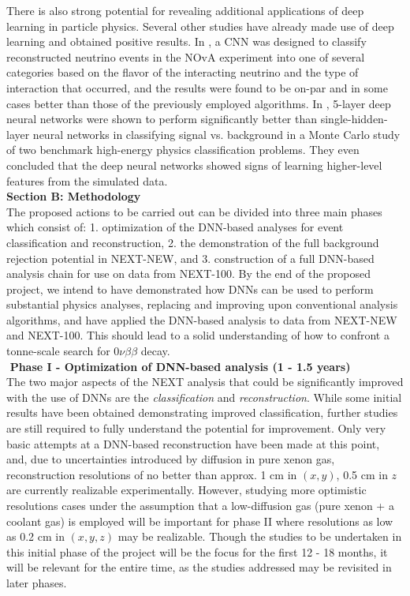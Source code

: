 \documentclass[11pt,a4paper]{article}
\begin{document}
There is also strong potential for revealing additional applications of deep learning in particle physics. Several other studies have already made use of deep learning and obtained positive results. In \cite{Aurisano_2016}, a CNN was designed to classify reconstructed neutrino events in the NOvA experiment into one of several categories based on the flavor of the interacting neutrino and the type of interaction that occurred, and the results were found to be on-par and in some cases better than those of the previously employed algorithms. In \cite{Baldi_2014}, 5-layer deep neural networks were shown to perform significantly better than single-hidden-layer neural networks in classifying signal vs. background in a Monte Carlo study of two benchmark high-energy physics classification problems. They even concluded that the deep neural networks showed signs of learning higher-level features from the simulated data.\\

{\noindent\textbf{Section B: Methodology}}\\
The proposed actions to be carried out can be divided into three main phases which consist of: 1. optimization of the DNN-based analyses for event classification and reconstruction, 2. the demonstration of the full background rejection potential in NEXT-NEW, and 3. construction of a full DNN-based analysis chain for use on data from NEXT-100. By the end of the proposed project, we intend to have demonstrated how DNNs can be used to perform substantial physics analyses, replacing and improving upon conventional analysis algorithms, and have applied the DNN-based analysis to data from NEXT-NEW and NEXT-100. This should lead to a solid understanding of how to confront a tonne-scale search for $0\nu\beta\beta$ decay.\\

\noindent\textbf{\textbullet\,\,Phase I - Optimization of DNN-based analysis (1 - 1.5 years)}\\
The two major aspects of the NEXT analysis that could be significantly improved with the use of DNNs are the \emph{classification} and \emph{reconstruction}. While some initial results have been obtained demonstrating improved classification, further studies are still required to fully understand the potential for improvement. Only very basic attempts at a DNN-based reconstruction have been made at this point, and, due to uncertainties introduced by diffusion in pure xenon gas, reconstruction resolutions of no better than approx. 1 cm in $(x,y)$, 0.5 cm in $z$ are currently realizable experimentally. However, studying more optimistic resolutions cases under the assumption that a low-diffusion gas (pure xenon + a coolant gas) is employed will be important for phase II where resolutions as low as 0.2 cm in $(x,y,z)$ may be realizable. Though the studies to be undertaken in this initial phase of the project will be the focus for the first 12 - 18 months, it will be relevant for the entire time, as the studies addressed may be revisited in later phases.
\end{document}
